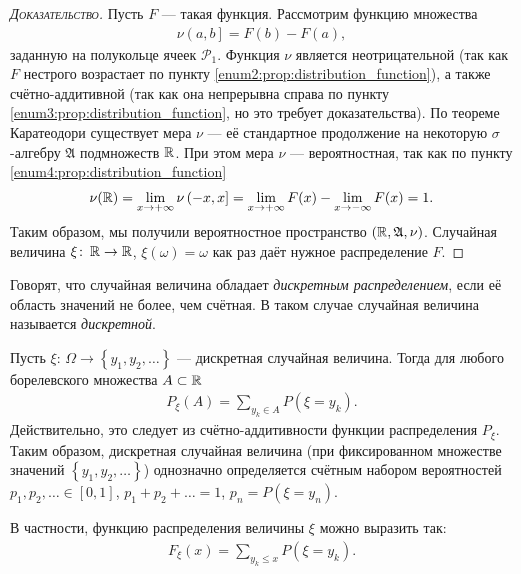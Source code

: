 \documentclass[../main.tex]{subfiles}
\begin{document}
\begin{proof}[\normalfont\textsc{Доказательство}]
 Пусть $F$ --- такая функция. Рассмотрим функцию множества
\begin{align*}
\nu \left(a, b\right] = F(b) - F(a),
\end{align*} заданную на полукольце ячеек $ \mathcal P_1 $. Функция $ \nu $ является неотрицательной (так как $ F $ нестрого возрастает по пункту \ref{enum2:prop:distribution_function}), а также счётно-аддитивной (так как она непрерывна справа по пункту \ref{enum3:prop:distribution_function}, но это требует доказательства). По теореме Каратеодори существует мера $ \nu $ --- её стандартное продолжение на некоторую $ \sigma $-алгебру $ \mathfrak A $ подмножеств $ \mathbb{R} $. При этом мера $ \nu $ --- вероятностная, так как по пункту \ref{enum4:prop:distribution_function}
\begin{align*}
 \nu(\mathbb{R}) = \lim_{x \to +\infty} \nu \left(-x, x\right] = \lim_{x \to +\infty} F(x) - \lim_{x \to -\infty} F(x) = 1. 
\end{align*} Таким образом, мы получили вероятностное пространство $ (\mathbb{R},\mathfrak A, \nu) $. Случайная величина $ \xi \colon\, \mathbb{R} \to \mathbb{R} $, $ \xi(\omega) = \omega $ как раз даёт нужное распределение $ F $.
\end{proof}

\begin{df}
 Говорят, что случайная величина обладает \textit{дискретным распределением}, если её область значений не более, чем счётная. В таком случае случайная величина называется \textit{дискретной}.
\end{df}
\begin{prop*}
 Пусть $\xi \colon\, \Omega \to \left\{ y_1, y_2, \ldots \right\}$ --- дискретная случайная величина. Тогда для любого борелевского множества $ A \subset \mathbb{R} $
 \begin{align*}
  P_{\xi}(A) = \sum_{y_k \in A}  P(\xi = y_k)
 .\end{align*} Действительно, это следует из счётно-аддитивности функции распределения $ P_{\xi} $. Таким образом, дискретная случайная величина (при фиксированном множестве значений $ \left\{ y_1, y_2, \ldots \right\} $) однозначно определяется счётным набором вероятностей $ p_1, p_2, \ldots \in [0,1] $, $ p_1 + p_2 + \ldots = 1 $, $ p_n = P(\xi = y_n) $.

 В частности, функцию распределения величины $ \xi $ можно выразить так:
 \begin{align*}
  F_{\xi}(x) = \sum_{y_k \leqslant x} P(\xi = y_k).
 \end{align*} 
\end{prop*}
\end{document}
